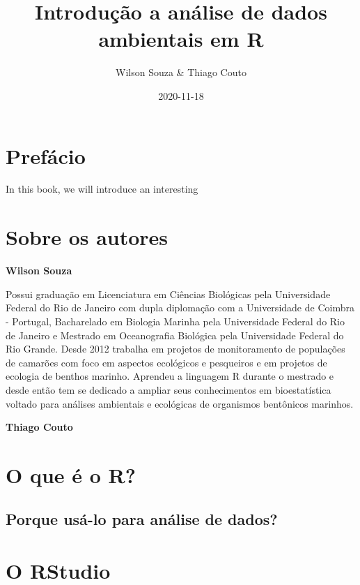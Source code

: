 \documentclass[]{book}
\title{Introdução a análise de dados ambientais em R}
\author{Wilson Souza \& Thiago Couto}
\date{2020-11-18}
\begin{document}
\maketitle

{
\setcounter{tocdepth}{1}
\tableofcontents
}
\hypertarget{prefuxe1cio}{%
\chapter*{Prefácio}\label{prefuxe1cio}}

In this book, we will introduce an interesting

\hypertarget{sobre-os-autores}{%
\chapter*{Sobre os autores}\label{sobre-os-autores}}

\textbf{Wilson Souza}

Possui graduação em Licenciatura em Ciências Biológicas pela Universidade Federal do Rio de Janeiro com dupla diplomação com a Universidade de Coimbra - Portugal, Bacharelado em Biologia Marinha pela Universidade Federal do Rio de Janeiro e Mestrado em Oceanografia Biológica pela Universidade Federal do Rio Grande. Desde 2012 trabalha em projetos de monitoramento de populações de camarões com foco em aspectos ecológicos e pesqueiros e em projetos de ecologia de benthos marinho. Aprendeu a linguagem R durante o mestrado e desde então tem se dedicado a ampliar seus conhecimentos em bioestatística voltado para análises ambientais e ecológicas de organismos bentônicos marinhos.

\textbf{Thiago Couto}

\hypertarget{o-que-uxe9-o-r}{%
\chapter{O que é o R?}\label{o-que-uxe9-o-r}}

\hypertarget{porque-usuxe1-lo-para-anuxe1lise-de-dados}{%
\section{Porque usá-lo para análise de dados?}\label{porque-usuxe1-lo-para-anuxe1lise-de-dados}}

\hypertarget{o-rstudio}{%
\chapter{O RStudio}\label{o-rstudio}}
\end{document}
